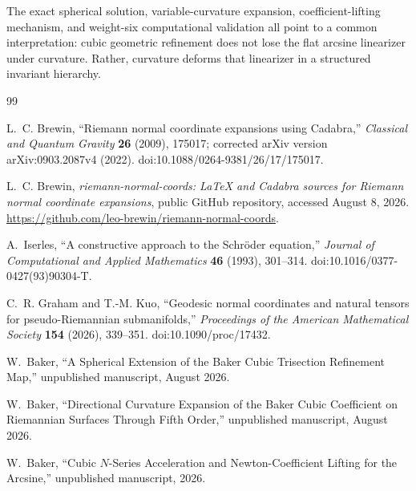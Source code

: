 \documentclass[11pt]{article}
\theoremstyle{definition}
\theoremstyle{remark}
\begin{document}
The exact spherical solution, variable-curvature expansion,
coefficient-lifting mechanism, and weight-six computational validation all
point to a common interpretation: cubic geometric refinement does not lose
the flat arcsine linearizer under curvature.  Rather, curvature deforms that
linearizer in a structured invariant hierarchy.

\begin{thebibliography}{99}

L.~C. Brewin,
\newblock ``Riemann normal coordinate expansions using Cadabra,''
\newblock \emph{Classical and Quantum Gravity} \textbf{26} (2009), 175017;
corrected arXiv version arXiv:0903.2087v4 (2022).
\newblock doi:10.1088/0264-9381/26/17/175017.

L.~C. Brewin,
\newblock \emph{riemann-normal-coords: LaTeX and Cadabra sources for Riemann normal coordinate expansions},
\newblock public GitHub repository, accessed August 8, 2026.
\newblock \url{https://github.com/leo-brewin/riemann-normal-coords}.

A.~Iserles,
\newblock ``A constructive approach to the Schr\"oder equation,''
\newblock \emph{Journal of Computational and Applied Mathematics}
\textbf{46} (1993), 301--314.
\newblock doi:10.1016/0377-0427(93)90304-T.

C.~R. Graham and T.-M. Kuo,
\newblock ``Geodesic normal coordinates and natural tensors for pseudo-Riemannian submanifolds,''
\newblock \emph{Proceedings of the American Mathematical Society}
\textbf{154} (2026), 339--351.
\newblock doi:10.1090/proc/17432.

W.~Baker,
\newblock ``A Spherical Extension of the Baker Cubic Trisection Refinement Map,''
\newblock unpublished manuscript, August 2026.

W.~Baker,
\newblock ``Directional Curvature Expansion of the Baker Cubic Coefficient on Riemannian Surfaces Through Fifth Order,''
\newblock unpublished manuscript, August 2026.

W.~Baker,
\newblock ``Cubic \(N\)-Series Acceleration and Newton-Coefficient Lifting for the Arcsine,''
\newblock unpublished manuscript, 2026.

\end{thebibliography}
\end{document}
